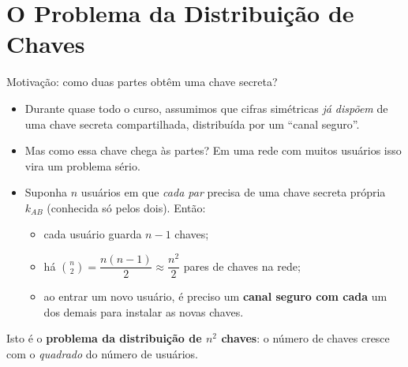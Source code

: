 \documentclass{beamer}
\begin{document}
\section{O Problema da Distribuição de Chaves}

\begin{frame}{Motivação: como duas partes obtêm uma chave secreta?}
    \begin{itemize}
        \item Durante quase todo o curso, assumimos que cifras simétricas \emph{já dispõem} de uma chave secreta compartilhada, distribuída por um ``canal seguro''.
        \medskip
        \item Mas \alert{como} essa chave chega às partes? Em uma rede com muitos usuários isso vira um problema sério.
        \medskip\pause
        \item Suponha $n$ usuários em que \emph{cada par} precisa de uma chave secreta própria $k_{AB}$ (conhecida só pelos dois). Então:
        \begin{itemize}
            \footnotesize
            \item cada usuário guarda $n-1$ chaves;
            \item há $\binom{n}{2} = \dfrac{n(n-1)}{2} \approx \dfrac{n^2}{2}$ pares de chaves na rede;
            \item ao entrar um novo usuário, é preciso um \textbf{canal seguro com cada} um dos demais para instalar as novas chaves.
        \end{itemize}
    \end{itemize}
    \medskip
    \begin{tcolorbox}[colback=red!5,colframe=red!60!black,boxrule=0.5pt]
        \footnotesize
        Isto é o \textbf{problema da distribuição de $n^2$ chaves}: o número de chaves cresce com o \emph{quadrado} do número de usuários.
    \end{tcolorbox}
\end{frame}
\end{document}
